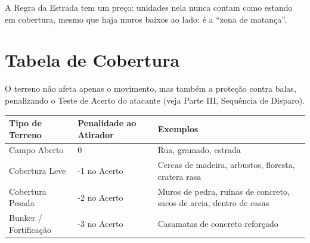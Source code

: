 \begin{nota}
A Regra da Estrada tem um preço: unidades nela nunca contam como estando em cobertura, mesmo que haja muros baixos ao lado: é a ``zona de matança''.
\end{nota}

\section{Tabela de Cobertura}

O terreno não afeta apenas o movimento, mas também a proteção contra balas, penalizando o Teste de Acerto do atacante (veja Parte III, Sequência de Disparo).

\begin{center}
\begin{tabular}{p{3.2cm}p{3.2cm}p{8.5cm}}
\toprule
Tipo de Terreno & Penalidade ao Atirador & Exemplos \\
\midrule
Campo Aberto & 0 & Rua, gramado, estrada \\
Cobertura Leve & -1 no Acerto & Cercas de madeira, arbustos, floresta, cratera rasa \\
Cobertura Pesada & -2 no Acerto & Muros de pedra, ruínas de concreto, sacos de areia, dentro de casas \\
Bunker / Fortificação & -3 no Acerto & Casamatas de concreto reforçado \\
\bottomrule
\end{tabular}
\end{center}
